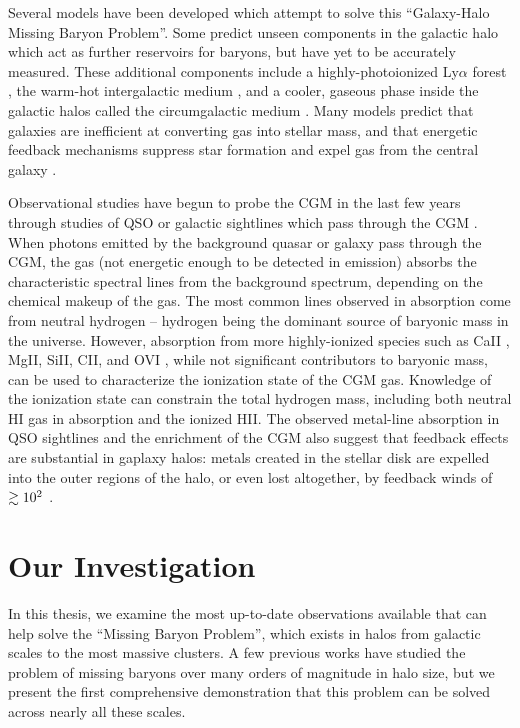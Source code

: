 Several models have been developed which attempt to solve this
``Galaxy-Halo Missing Baryon Problem''. Some predict unseen components
in the galactic halo which act as further reservoirs for baryons, but
have yet to be accurately measured.  These additional components
include a highly-photoionized Ly$\alpha$ forest \citep{Sargent1980,
  Cen1994}, the warm-hot intergalactic medium \citep[WHIM][]{Cen1999,
  Dave1999}, and a cooler, gaseous phase inside the galactic halos
called the circumgalactic medium \citep[CGM][]{Bahcall1969,
  Bergeron1985, Lanzetta1995}. Many models predict that galaxies are inefficient at
converting gas into stellar mass, and that energetic feedback
mechanisms suppress star formation and expel gas from the central
galaxy \citep{Somerville1999, Oppenheimer2010}. 

Observational studies have begun to probe the CGM in the last few
years through studies of QSO or galactic sightlines which pass through
the CGM \citep{Steidel2010, Prochaska2011, Tumlinson2011,
  Werk2013}. When photons emitted by the background quasar or galaxy
pass through the CGM, the gas (not energetic enough to be detected in
emission) absorbs the characteristic spectral lines from the
background spectrum, depending on the chemical makeup of the gas. The
most common lines observed in absorption come from neutral hydrogen --
hydrogen being the dominant source of baryonic mass in the
universe. However, absorption from more highly-ionized species such as
CaII \citep{Zhu2013}, MgII, SiII, CII, and OVI \citep{Tumlinson2011,
  Werk2014}, while not significant contributors to baryonic mass, can
be used to characterize the ionization state of the CGM gas. Knowledge
of the ionization state can constrain the total hydrogen mass,
including both neutral HI gas in absorption and the ionized HII. The
observed metal-line absorption in QSO sightlines and the enrichment of
the CGM also suggest that feedback effects are substantial in gaplaxy
halos: metals created in the stellar disk are expelled into the outer
regions of the halo, or even lost altogether, by feedback winds of
$\gtrsim 10^2$ \kms{} \citep{D'Odorico1991, Chen2010, Oppenheimer2012,
  Booth2012}.

\section{Our Investigation}
\label{sec:investigation}

In this thesis, we examine the most up-to-date observations available
that can help solve the ``Missing Baryon Problem'', which exists in
halos from galactic scales to the most massive clusters. A few
previous works  have studied the problem of
missing baryons over many orders of magnitude in halo size, but we
present the first comprehensive demonstration that this problem can be
solved across nearly all these scales.

